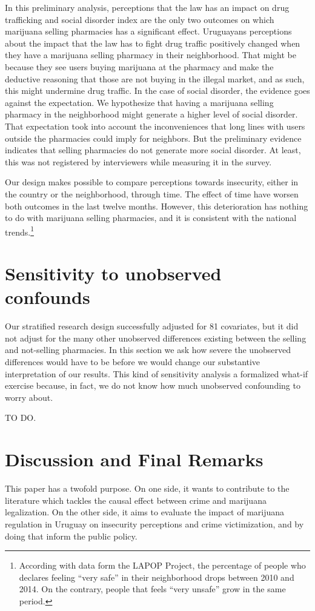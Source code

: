 \documentclass[11pt]{article}
\begin{document}
In this preliminary analysis, perceptions that the law has an impact on drug trafficking and social disorder index are the only two outcomes on which marijuana selling pharmacies has a significant effect. Uruguayans perceptions about the impact that the law has to fight drug traffic positively changed when they have  a marijuana selling pharmacy in their neighborhood. That might be because they see users buying marijuana at the pharmacy and make the deductive reasoning that those are not buying in the illegal market, and as such, this might undermine drug traffic. In the case of social disorder, the evidence goes against the expectation. We hypothesize that having a marijuana selling pharmacy in the neighborhood might generate a higher level of social disorder. That expectation took into account the inconveniences that long lines with users outside the pharmacies could imply for neighbors. But the preliminary evidence indicates that selling pharmacies do not generate more social disorder. At least, this was not registered by interviewers while measuring it in the survey.

Our design makes possible to compare perceptions towards insecurity, either in the country or the neighborhood, through time. The effect of time have worsen both outcomes in the last twelve months. However, this deterioration has nothing to do with marijuana selling pharmacies, and it is consistent with  the national trends.\footnote{According with data form the LAPOP Project, the percentage of people who declares feeling “very safe” in their neighborhood drops between 2010 and 2014. On the contrary, people that feels “very unsafe” grow in the same period.}

\section{Sensitivity to unobserved confounds} \label{sec:sensitivity}

Our stratified research design successfully adjusted for 81 covariates, but it did not adjust for the many other unobserved differences existing between the selling and not-selling pharmacies.  In this section we ask how severe the unobserved differences would have to be before we would change our substantive interpretation of our results. This kind of sensitivity analysis a formalized what-if exercise because, in fact, we do not know how much unobserved confounding to worry about.

TO DO.

\section{Discussion and Final Remarks}
This paper has a twofold purpose. On one side, it wants to contribute to the literature which tackles the causal effect between crime and marijuana legalization. On the other side, it aims to evaluate the impact of marijuana regulation in Uruguay on insecurity perceptions and crime victimization, and by doing that inform the public policy.
\end{document}
